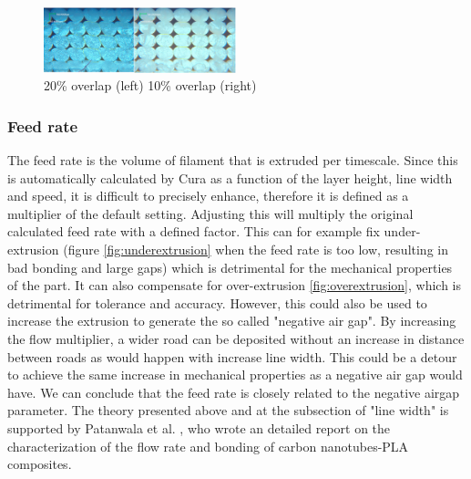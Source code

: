 \begin{figure}[H]
    \centering
    \includegraphics[width=0.5\textwidth]{chapter_2/figures/Meso10and20.jpg}
    \caption{20\% overlap (left) 10\% overlap (right)\cite{Somireddy2017MechanicalMesostructure}}
    \label{fig:Meso10&20}
\end{figure}

\subsubsection{Feed rate}
The feed rate is the volume of filament that is extruded per timescale. Since this is automatically calculated by Cura as a function of the layer height, line width and speed, it is difficult to precisely enhance, therefore it is defined as a multiplier of the default setting. Adjusting this will multiply the original calculated feed rate with a defined factor. This can for example fix under-extrusion (figure \ref{fig:underextrusion} when the feed rate is too low, resulting in bad bonding and large gaps) which is detrimental for the mechanical properties of the part. It can also compensate for over-extrusion \ref{fig:overextrusion}, which is detrimental for tolerance and accuracy. However, this could also be used to increase the extrusion to generate the so called "negative air gap". By increasing the flow multiplier, a wider road can be deposited without an increase in distance between roads as would happen with increase line width. This could be a detour to achieve the same increase in mechanical properties as a negative air gap would have.
We can conclude that the feed rate is closely related to the negative airgap parameter. The theory presented above and at the subsection of "line width" is supported by Patanwala et al. \cite{Patanwala2018TheComposites}, who wrote an detailed report on the characterization of the flow rate and bonding of carbon nanotubes-PLA composites.  
